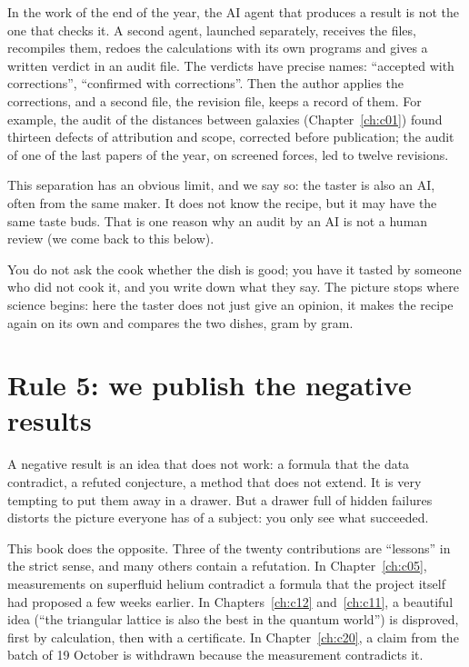 In the work of the end of the year, the AI agent that produces a result is not the one that checks it. A second agent, launched
separately, receives the files, recompiles them, redoes the calculations with its own programs and gives a written
verdict in an audit file. The verdicts have precise names: ``accepted with corrections'', ``confirmed with
corrections''. Then the author applies the corrections, and a second file, the revision file, keeps a record of them.
For example, the audit of the distances between galaxies (Chapter~\ref{ch:c01}) found thirteen defects of attribution
and scope, corrected before publication; the audit of one of the last papers of the year, on screened forces, led to twelve
revisions.

This separation has an obvious limit, and we say so: the taster is also an AI, often from the same maker. It does not
know the recipe, but it may have the same taste buds. That is one reason why an audit by an AI is not a human review
(we come back to this below).

\begin{analogie}
You do not ask the cook whether the dish is good; you have it tasted by someone who did not cook it, and you write
down what they say. The picture stops where science begins: here the taster does not just give an opinion, it makes
the recipe again on its own and compares the two dishes, gram by gram.
\end{analogie}

\section{Rule 5: we publish the negative results}

A negative result is an idea that does not work: a formula that the data contradict, a refuted conjecture, a method
that does not extend. It is very tempting to put them away in a drawer. But a drawer full of hidden failures distorts
the picture everyone has of a subject: you only see what succeeded.

This book does the opposite. Three of the twenty contributions are ``lessons'' in the strict sense, and many others
contain a refutation. In Chapter~\ref{ch:c05}, measurements on superfluid helium contradict a formula that the
project itself had proposed a few weeks earlier. In Chapters~\ref{ch:c12} and~\ref{ch:c11}, a beautiful idea (``the
triangular lattice is also the best in the quantum world'') is disproved, first by calculation, then with a
certificate. In Chapter~\ref{ch:c20}, a claim from the batch of 19 October is withdrawn because the measurement
contradicts it.

